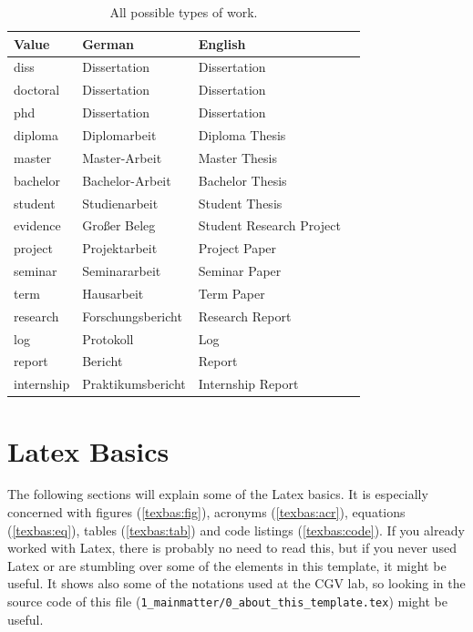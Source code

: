\begin{table}[t]
	\centering
	\caption{All possible types of work.}
	\label{tab:subj-id}
	\renewcommand{\arraystretch}{1.3}
	\begin{tabular}{@{}llll@{}}
		\toprule
		Value          & German            & English                  \\ \midrule
		diss           & Dissertation      & Dissertation             \\
		doctoral       & Dissertation      & Dissertation             \\
		phd            & Dissertation      & Dissertation             \\
		diploma        & Diplomarbeit      & Diploma Thesis           \\
		master         & Master-Arbeit     & Master Thesis            \\
		bachelor       & Bachelor-Arbeit   & Bachelor Thesis          \\
		student        & Studienarbeit     & Student Thesis           \\
		evidence       & Großer Beleg      & Student Research Project \\
		project        & Projektarbeit     & Project Paper            \\
		seminar        & Seminararbeit     & Seminar Paper            \\
		term           & Hausarbeit        & Term Paper               \\
		research       & Forschungsbericht & Research Report          \\
		log            & Protokoll         & Log                      \\
		report         & Bericht           & Report                   \\
		internship     & Praktikumsbericht & Internship Report        \\ \bottomrule
	\end{tabular}
\end{table}

\section{Latex Basics}
The following sections will explain some of  the Latex basics. It is especially concerned with figures (\ref{texbas:fig}), acronyms (\ref{texbas:acr}), equations (\ref{texbas:eq}), tables (\ref{texbas:tab}) and code listings (\ref{texbas:code}). If you already worked with Latex, there is probably no need to read this, but if you never used Latex or are stumbling over some of the elements in this template, it might be useful. It shows also some of the notations used at the \ac{CGV lab}, so looking in the source code of this file (\texttt{1\_mainmatter/0\_about\_this\_template.tex}) might be useful.

